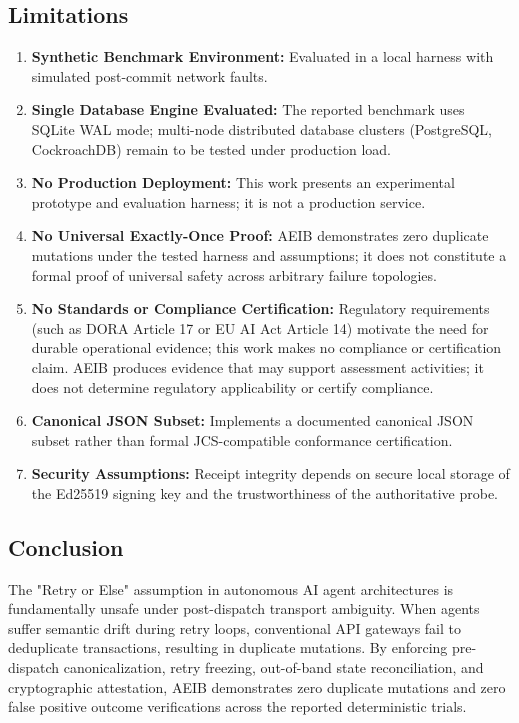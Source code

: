 \documentclass[10pt,journal,compsoc]{IEEEtran}
\begin{document}
\subsection{Limitations}
\begin{enumerate}
    \item \textbf{Synthetic Benchmark Environment:} Evaluated in a local harness with simulated post-commit network faults.
    \item \textbf{Single Database Engine Evaluated:} The reported benchmark uses SQLite WAL mode; multi-node distributed database clusters (PostgreSQL, CockroachDB) remain to be tested under production load.
    \item \textbf{No Production Deployment:} This work presents an experimental prototype and evaluation harness; it is not a production service.
    \item \textbf{No Universal Exactly-Once Proof:} AEIB demonstrates zero duplicate mutations under the tested harness and assumptions; it does not constitute a formal proof of universal safety across arbitrary failure topologies.
    \item \textbf{No Standards or Compliance Certification:} Regulatory requirements (such as DORA Article 17 or EU AI Act Article 14) motivate the need for durable operational evidence; this work makes no compliance or certification claim. AEIB produces evidence that may support assessment activities; it does not determine regulatory applicability or certify compliance.
    \item \textbf{Canonical JSON Subset:} Implements a documented canonical JSON subset rather than formal JCS-compatible conformance certification.
    \item \textbf{Security Assumptions:} Receipt integrity depends on secure local storage of the Ed25519 signing key and the trustworthiness of the authoritative probe.
\end{enumerate}

\subsection{Conclusion}
The "Retry or Else" assumption in autonomous AI agent architectures is fundamentally unsafe under post-dispatch transport ambiguity. When agents suffer semantic drift during retry loops, conventional API gateways fail to deduplicate transactions, resulting in duplicate mutations. By enforcing pre-dispatch canonicalization, retry freezing, out-of-band state reconciliation, and cryptographic attestation, AEIB demonstrates zero duplicate mutations and zero false positive outcome verifications across the reported deterministic trials.
\end{document}
